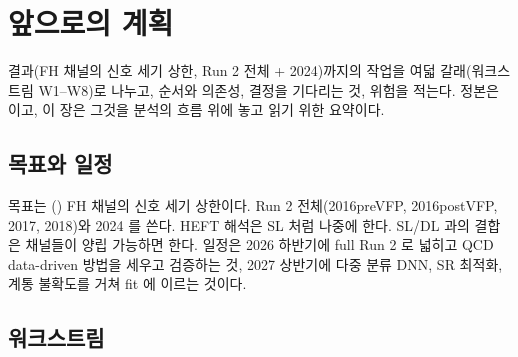 \chapter{앞으로의 계획}\label{ch:plan}

결과(FH 채널의 신호 세기 상한, Run 2 전체 + 2024)까지의 작업을 여덟 갈래(워크스트림 W1–W8)로 나누고, 순서와 의존성, 결정을 기다리는 것,
위험을 적는다. 정본은  이고, 이 장은 그것을 분석의 흐름 위에 놓고 읽기 위한 요약이다.

\section{목표와 일정}\label{sec:plan-goal}

목표는 \ttHH(\HHfourb) FH 채널의 신호 세기 상한이다. Run 2 전체(2016preVFP, 2016postVFP, 2017, 2018)와 2024 를 쓴다. HEFT 해석은
SL 처럼 나중에 한다. SL/DL 과의 결합은 채널들이 양립 가능하면 한다. 일정은 2026 하반기에 full Run 2 로 넓히고
QCD data-driven 방법을 세우고 검증하는 것, 2027 상반기에 다중 분류 DNN, SR 최적화, 계통 불확도를 거쳐 fit 에 이르는 것이다.

\section{워크스트림}\label{sec:plan-ws}

